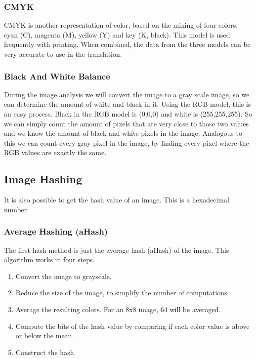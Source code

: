\documentclass[12pt]{article}
\begin{document}
\subsubsection{CMYK}
CMYK is another representation of color, based on the mixing of four colors, cyan (C), magenta (M), yellow (Y) and key (K, black). This model is used frequently with printing.
\newline
When combined, the data from the three models can be very accurate to use in the translation.

\subsubsection{Black And White Balance}
During the image analysis we will convert the image to a gray scale image, so we can determine the amount of white and black in it. Using the RGB model, this is an easy process. Black in the RGB model is (0,0,0) and white is (255,255,255). So we can simply count the amount of pixels that are very close to those two values and we know the amount of black and white pixels in the image.
\newline
Analogous to this we can count every gray pixel in the image, by finding every pixel where the RGB values are exactly the same.

\subsection{Image Hashing}
It is also possible to get the hash value of an image. This is a hexadecimal number.

\subsubsection{Average Hashing (aHash)}
The first hash method is just the average hash (aHash) of the image. This algorithm works in four steps.

\begin{enumerate}
	\item Convert the image to grayscale. 
	\item Reduce the size of the image, to simplify the number of computations.
	\item Average the resulting colors. For an 8x8 image, 64 will be averaged.
	\item Compute the bits of the hash value by comparing if each color value is above or below the mean.
	\item Construct the hash.
\end{enumerate}
\end{document}
